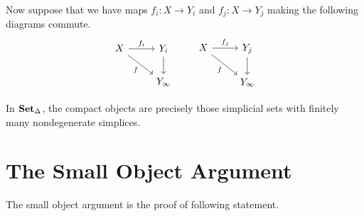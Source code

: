 \documentclass[main.tex]{subfiles}
\begin{document}
\begin{example}
  Now suppose that we have maps $f_{i}\colon X \to Y_{i}$ and $f_{j}\colon X \to Y_{j}$ making the following diagrams commute.
  \begin{equation*}
    \begin{tikzcd}
      X
      \arrow[r, "f_{i}"]
      \arrow[dr, swap, "f"]
      & Y_{i}
      \arrow[d]
      \\
      & Y_{\infty}
    \end{tikzcd}
    \qquad
    \begin{tikzcd}
      X
      \arrow[r, "f_{j}"]
      \arrow[dr, swap, "f"]
      & Y_{j}
      \arrow[d]
      \\
      & Y_{\infty}
    \end{tikzcd}
  \end{equation*}
\end{example}

\begin{example}
  \label{eg:compact_in_sset}
  In $\operatorname{\mathbf{Set}_{\Delta}}$, the compact objects are precisely those simplicial sets with finitely many nondegenerate simplices.
\end{example}

\section{The Small Object Argument}
\label{sec:the_small_object_argument}

The small object argument is the proof of following statement.
\end{document}
